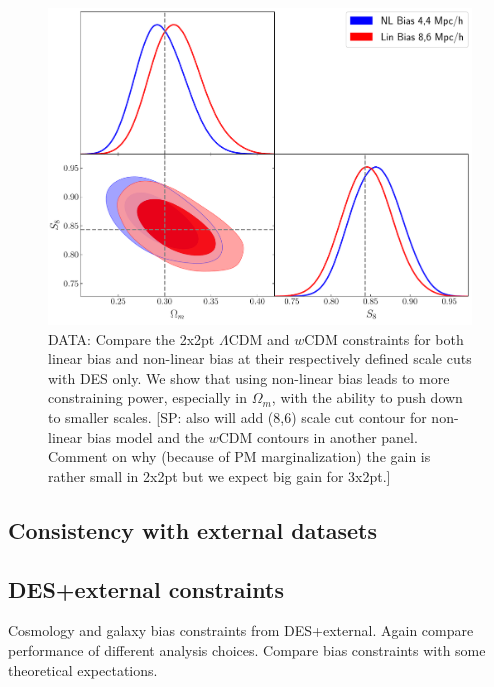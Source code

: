 \documentclass[fleqn,usenatbib]{mnras}
\newcommand{\SP}[1]{{\color{red}[SP: #1]}}
\begin{document}
\begin{figure}
\includegraphics[width=\columnwidth]{figs/compare_cosmo_nl44_lin86.pdf}
\caption[]{DATA: Compare the 2x2pt $\Lambda$CDM and $w$CDM constraints for both linear bias and non-linear bias at their respectively defined scale cuts with DES only. We show that using non-linear bias leads to more constraining power, especially in $\Omega_m$, with the ability to push down to smaller scales.  \SP{also will add (8,6) scale cut contour for non-linear bias model and the $w$CDM contours in another panel. Comment on why (because of PM marginalization) the gain is rather small in 2x2pt but we expect big gain for 3x2pt.} }
\label{fig:des_comp}
\end{figure}



\subsection{Consistency with external datasets}

\subsection{DES+external constraints}

Cosmology and galaxy bias constraints from DES+external. Again compare performance of different analysis choices. Compare bias constraints with some theoretical expectations.
\end{document}
